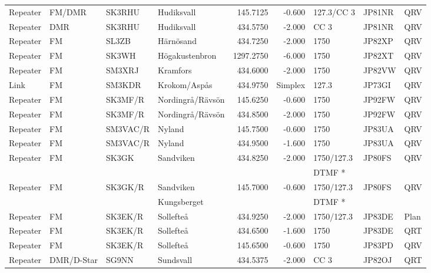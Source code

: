 \begin{longtable}{llllrrlll}
Repeater   & FM/DMR     & SK3RHU   & Hudiksvall       & 145.7125    & -0.600   & 127.3/CC 3 & JP81NR & QRV  \\
Repeater   & DMR        & SK3RHU   & Hudiksvall       & 434.5750    & -2.000   & CC 3       & JP81NR & QRV  \\
Repeater   & FM         & SL3ZB    & Härnösand        & 434.7250    & -2.000   & 1750       & JP82XP & QRV  \\
Repeater   & FM         & SK3WH    & Högakustenbron   & 1297.2750   & -6.000   & 1750       & JP82XT & QRV  \\
Repeater   & FM         & SM3XRJ   & Kramfors         & 434.6000    & -2.000   & 1750       & JP82VW & QRV  \\
Link       & FM         & SM3KDR   & Krokom/Aspås     & 434.9750    & Simplex  & 127.3      & JP73GI & QRV  \\
Repeater   & FM         & SK3MF/R  & Nordingrå/Rävsön & 145.6250    & -0.600   & 1750       & JP92FW & QRV  \\
Repeater   & FM         & SK3MF/R  & Nordingrå/Rävsön & 434.8500    & -2.000   & 1750       & JP92FW & QRV  \\
Repeater   & FM         & SM3VAC/R & Nyland           & 145.7500    & -0.600   & 1750       & JP83UA & QRV  \\
Repeater   & FM         & SM3VAC/R & Nyland           & 434.9500    & -1.600   & 1750       & JP83UA & QRV  \\
Repeater   & FM         & SK3GK    & Sandviken        & 434.8250    & -2.000   & 1750/127.3 & JP80FS & QRV  \\
           &            &          &                  &             &          & DTMF *     &        &      \\
Repeater   & FM         & SK3GK/R  & Sandviken        & 145.7000    & -0.600   & 1750/127.3 & JP80FS & QRV  \\
           &            &          & Kungsberget      &             &          & DTMF *     &        &      \\
Repeater   & FM         & SK3EK/R  & Sollefteå        & 434.9250    & -2.000   & 1750/127.3 & JP83DE & Plan \\
Repeater   & FM         & SK3EK/R  & Sollefteå        & 434.6500    & -1.600   & 1750       & JP83DE & QRT  \\
Repeater   & FM         & SK3EK/R  & Sollefteå        & 145.6500    & -0.600   & 1750       & JP83PD & QRV  \\
Repeater   & DMR/D-Star & SG9NN    & Sundsvall        & 434.5375    & -2.000   & CC 3       & JP82OJ & QRT  \\

\end{longtable}
